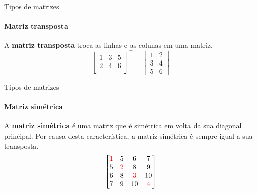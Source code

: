\begin{frame}[t]{Tipos de matrizes} 
    \framesubtitle{Matriz transposta}

    A \textbf{matriz transposta} troca as linhas e as colunas em uma matriz.
    \begin{equation}
        \begin{bmatrix}
            1 & 3 & 5\\
            2 & 4 & 6\\
         \end{bmatrix}^\top =
            \begin{bmatrix}
            1 & 2 \\
            3 & 4 \\
            5 & 6   
         \end{bmatrix}
    \end{equation}
    \vspace*{0.3cm}
\end{frame}
\begin{frame}[t]{Tipos de matrizes} 
    \framesubtitle{Matriz simétrica}

    A \textbf{matriz simétrica} é uma matriz que é simétrica em volta da sua diagonal principal. Por causa desta característica, a matriz simétrica é sempre igual a sua transposta. 
    \begin{equation}
            \begin{bmatrix}
            \textcolor{red}{1} & 5 & 6 & 7\\
            5 & \textcolor{red}{2} & 8 & 9\\
            6 & 8 & \textcolor{red}{3} & 10\\ 
            7 & 9 & 10 & \textcolor{red}{4}\\ 
         \end{bmatrix}
    \end{equation}
    \vspace*{0.3cm}
\end{frame}
